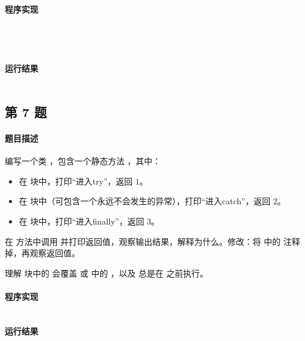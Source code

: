 \documentclass{academics}
\begin{document}
\paragraph{程序实现} {
    \inputminted[label=Parent.java]{java}{../src/P06/Parent.java}
    \inputminted[label=Child1.java]{java}{../src/P06/Child1.java}
    \inputminted[label=Child2.java]{java}{../src/P06/Child2.java}
    \inputminted[label=OverrideTest.java]{java}{../src/P06/OverrideTest.java}
}

\paragraph{运行结果} {
    \inputminted{text}{../res/P06.out}
}

\subsection{第 7 题}

\paragraph{题目描述} {
    编写一个类 ，包含一个静态方法 ，其中：
    \begin{itemize}
        \item 在  块中，打印``进入try''，返回 $1$。
        \item 在  块中（可包含一个永远不会发生的异常），打印``进入catch''，返回 $2$。
        \item 在  块中，打印``进入finally''，返回 $3$。
    \end{itemize}
    在  方法中调用  并打印返回值，观察输出结果，解释为什么。修改：将  中的  注释掉，再观察返回值。

    理解  块中的  会覆盖  或  中的 ，以及  总是在  之前执行。
}

\paragraph{程序实现} {
    \inputminted[label=FinallyReturnDemo.java]{java}{../src/P07/FinallyReturnDemo.java}
}

\paragraph{运行结果} {
    \inputminted{text}{../res/P07.out}
}
\end{document}
